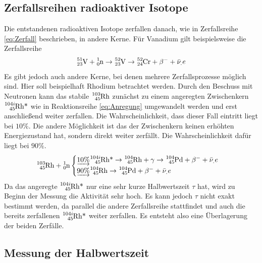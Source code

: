 \subsection{Zerfallsreihen radioaktiver Isotope}
Die entstandenen radioaktiven Isotope zerfallen danach, wie in Zerfallsreihe \eqref{eq:Zerfall} beschrieben, in andere Kerne.
Für Vanadium gilt beispielsweise die Zerfallsreihe
\begin{equation}
\ce{^{51}_{23}V} + \ce{^{1}_{0}n} \rightarrow \ce{^{52}_{23}V} \rightarrow \ce{^{52}_{24}Cr} +  \beta^- + \bar{\nu}_.e
\end{equation}
Es gibt jedoch auch andere Kerne, bei denen mehrere Zerfallsprozesse möglich sind.
Hier soll beispielhaft Rhodium betrachtet werden.\newline
Durch den Beschuss mit Neutronen kann das stabile $\ce{^{103}_{45}Rh}$ zunächst zu einem angeregten Zwischenkern $\ce{^{104i}_{45}Rh\text{*}}$ wie in Reaktionsreihe \eqref{eq:Anregung} umgewandelt werden und erst anschließend weiter zerfallen. Die Wahrscheinlichkeit, dass dieser Fall eintritt liegt bei $10\%$.
Die andere Möglichkeit ist das der Zwischenkern keinen erhöhten Energiezustand hat, sondern direkt weiter zerfällt. Die Wahrscheinlichkeit dafür liegt bei $90\%$.
\begin{equation}
\ce{^{103}_{45}Rh} + \ce{^{1}_{0}n}
\begin{cases}
\underrightarrow{10\%}\ce{^{104i}_{45}Rh\text{*}}\rightarrow \ce{^{104}_{45}Rh}+ \gamma \rightarrow \ce{^{104}_{45}Pd} + \beta^- + \bar{\nu}_.e \\
\underrightarrow{90\%}\ce{^{104}_{45}Rh}\rightarrow \ce{^{104}_{45}Pd} + \beta^- + \bar{\nu}_.e
\end{cases}
\end{equation}
Da das angeregte $\ce{^{104i}_{45}Rh\text{*}}$ nur eine sehr kurze Halbwertszeit $\tau$ hat, wird zu Beginn der Messung die Aktivität sehr hoch. Es kann jedoch $\tau$ nicht exakt bestimmt werden, da parallel die andere Zerfallsreihe stattfindet und auch die bereits zerfallenen  $\ce{^{104i}_{45}Rh\text{*}}$ weiter zerfallen.
Es entsteht also eine Überlagerung der beiden Zerfälle.

\subsection{Messung der Halbwertszeit}

